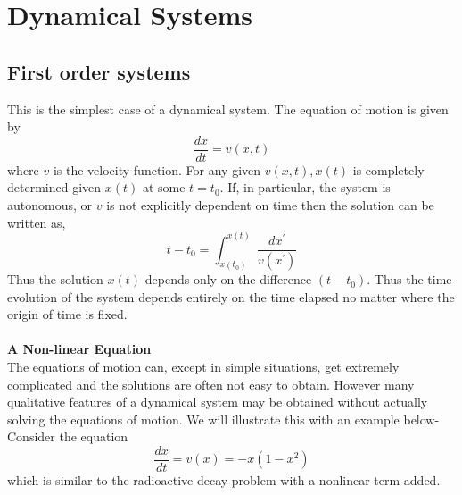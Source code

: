 \chapter{Dynamical Systems}



\section{ First order systems}
This is the simplest case of a dynamical system. The equation of motion  is given by
$$
\frac{d x}{d t}=v(x, t)
$$
where $v$ is the velocity function. For any given $v(x, t), x(t)$ is completely determined given $x(t)$ at some $t=t_{0} .$ If, in particular, the system is autonomous, or $v$ is not explicitly dependent on time then the solution can be written as,
$$
t-t_{0}=\int_{x\left(t_{0}\right)}^{x(t)} \frac{d x^{\prime}}{v\left(x^{\prime}\right)}
$$
Thus the solution $x(t)$ depends only on the difference $\left(t-t_{0}\right)$. Thus the time evolution of the system depends entirely on the time elapsed no matter where the origin of time is fixed.\\\\
\textbf{ A Non-linear Equation}\\
The equations of motion can, except in simple situations, get extremely complicated and the solutions are often not easy to obtain. However many qualitative features of a dynamical system may be obtained without actually solving the equations of motion. We will illustrate this with an example below- Consider the equation
$$
\frac{d x}{d t}=v(x)=-x\left(1-x^{2}\right)
$$
which is similar to the radioactive decay problem with a nonlinear term added. 

